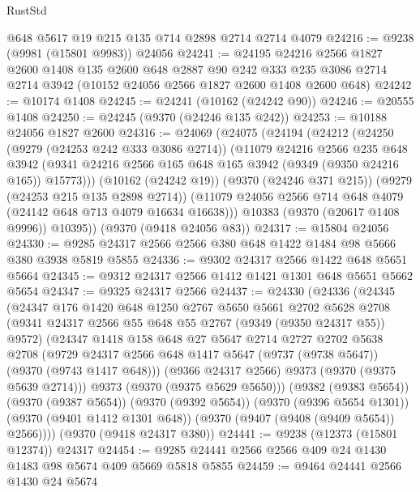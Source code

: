 \begin{lexlean}{RustStd}
\begin{coremodule}
{\begin{coremodule}
{{{{{{{{{{{{{{{{{{{{{{{{{{{{{{{{{{{{{{{    @648
    @5617
    @19
    @215
    @135
    @714
    @2898
    @2714
    @2714
    @4079
@24216 := @9238 (@9981 (@15801 @9983)) @24056
@24241 := @24195
    @24216
    @2566
    @1827
    @2600
    @1408
    @135
    @2600
    @648
    @2887
    @90
    @242
    @333
    @235
    @3086
    @2714
    @2714
    @3942
    (@10152 @24056 @2566 @1827 @2600 @1408 @2600 @648)
@24242 := @10174 @1408
@24245 := @24241 (@10162 (@24242 @90))
@24246 := @20555 @1408
@24250 := @24245 (@9370 (@24246 @135 @242))
@24253 := @10188 @24056 @1827 @2600
@24316 := @24069
    (@24075
      (@24194
        (@24212
          (@24250
            (@9279 (@24253 @242 @333 @3086 @2714))
            (@11079
              @24216
              @2566
              @235
              @648
              @3942
              (@9341 @24216 @2566 @165 @648 @165 @3942 (@9349 (@9350 @24216 @165)) @15773)))
          (@10162 (@24242 @19))
          (@9370 (@24246 @371 @215))
          (@9279 (@24253 @215 @135 @2898 @2714))
          (@11079 @24056 @2566 @714 @648 @4079 (@24142 @648 @713 @4079 @16634 @16638)))
        @10383
        (@9370 (@20617 @1408 @9996))
        @10395))
    (@9370 (@9418 @24056 @83))
@24317 := @15804 @24056
@24330 := @9285 @24317 @2566 @2566 @380 @648 @1422 @1484 @98 @5666 @380 @3938 @5819 @5855
@24336 := @9302 @24317 @2566 @1422 @648 @5651 @5664
@24345 := @9312 @24317 @2566 @1412 @1421 @1301 @648 @5651 @5662 @5654
@24347 := @9325 @24317 @2566
@24437 := @24330
    (@24336
      (@24345
        (@24347
          @176
          @1420
          @648
          @1250
          @2767
          @5650
          @5661
          @2702
          @5628
          @2708
          (@9341 @24317 @2566 @55 @648 @55 @2767 (@9349 (@9350 @24317 @55)) @9572)
          (@24347
            @1418
            @158
            @648
            @27
            @5647
            @2714
            @2727
            @2702
            @5638
            @2708
            (@9729 @24317 @2566 @648 @1417 @5647 (@9737 (@9738 @5647)) (@9370 (@9743 @1417 @648)))
            (@9366 @24317 @2566)
            @9373
            (@9370 (@9375 @5639 @2714)))
          @9373
          (@9370 (@9375 @5629 @5650)))
        (@9382 (@9383 @5654))
        (@9370 (@9387 @5654))
        (@9370 (@9392 @5654))
        (@9370 (@9396 @5654 @1301))
        (@9370 (@9401 @1412 @1301 @648))
        (@9370 (@9407 (@9408 (@9409 @5654)) @2566))))
    (@9370 (@9418 @24317 @380))
@24441 := @9238 (@12373 (@15801 @12374)) @24317
@24454 := @9285 @24441 @2566 @2566 @409 @24 @1430 @1483 @98 @5674 @409 @5669 @5818 @5855
@24459 := @9464 @24441 @2566 @1430 @24 @5674
}}}}}}}}}}}}}}}}}}}}}}}}}}}}}}}}}}}}}}}
\end{coremodule}}
\end{coremodule}
\end{lexlean}
